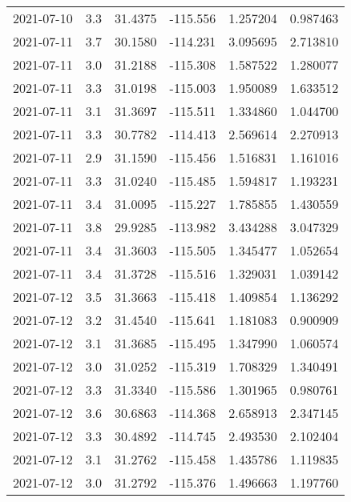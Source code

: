 \begin{tabular}{lrrrrr}
2021-07-10 &       3.3 &  31.4375 &  -115.556 &         1.257204 &         0.987463 \\
2021-07-11 &       3.7 &  30.1580 &  -114.231 &         3.095695 &         2.713810 \\
2021-07-11 &       3.0 &  31.2188 &  -115.308 &         1.587522 &         1.280077 \\
2021-07-11 &       3.3 &  31.0198 &  -115.003 &         1.950089 &         1.633512 \\
2021-07-11 &       3.1 &  31.3697 &  -115.511 &         1.334860 &         1.044700 \\
2021-07-11 &       3.3 &  30.7782 &  -114.413 &         2.569614 &         2.270913 \\
2021-07-11 &       2.9 &  31.1590 &  -115.456 &         1.516831 &         1.161016 \\
2021-07-11 &       3.3 &  31.0240 &  -115.485 &         1.594817 &         1.193231 \\
2021-07-11 &       3.4 &  31.0095 &  -115.227 &         1.785855 &         1.430559 \\
2021-07-11 &       3.8 &  29.9285 &  -113.982 &         3.434288 &         3.047329 \\
2021-07-11 &       3.4 &  31.3603 &  -115.505 &         1.345477 &         1.052654 \\
2021-07-11 &       3.4 &  31.3728 &  -115.516 &         1.329031 &         1.039142 \\
2021-07-12 &       3.5 &  31.3663 &  -115.418 &         1.409854 &         1.136292 \\
2021-07-12 &       3.2 &  31.4540 &  -115.641 &         1.181083 &         0.900909 \\
2021-07-12 &       3.1 &  31.3685 &  -115.495 &         1.347990 &         1.060574 \\
2021-07-12 &       3.0 &  31.0252 &  -115.319 &         1.708329 &         1.340491 \\
2021-07-12 &       3.3 &  31.3340 &  -115.586 &         1.301965 &         0.980761 \\
2021-07-12 &       3.6 &  30.6863 &  -114.368 &         2.658913 &         2.347145 \\
2021-07-12 &       3.3 &  30.4892 &  -114.745 &         2.493530 &         2.102404 \\
2021-07-12 &       3.1 &  31.2762 &  -115.458 &         1.435786 &         1.119835 \\
2021-07-12 &       3.0 &  31.2792 &  -115.376 &         1.496663 &         1.197760 \\

\end{tabular}

